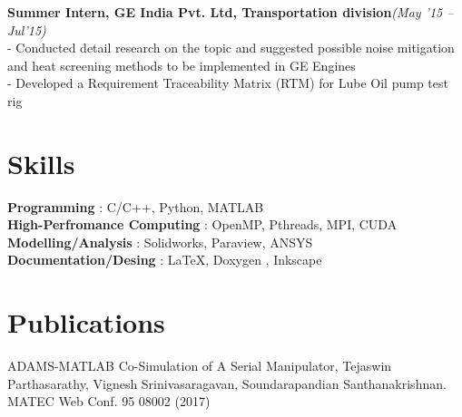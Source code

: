 \documentclass[margin,line]{res}
\begin{document}
\begin{resume}
\textbullet\hspace{0.005cm} {\bf Summer Intern, GE India Pvt. Ltd, Transportation division}\hfill {\em (May '15 -- Jul'15)}\\
- Conducted detail research on the topic and suggested possible noise mitigation and heat screening methods to be implemented in GE Engines\\
- Developed a Requirement Traceability Matrix (RTM) for Lube Oil pump test rig

\section {\sc Skills}
\textbullet\hspace{0.005cm} {\bf Programming} : C/C++, Python, MATLAB \\
\textbullet\hspace{0.005cm} {\bf High-Perfromance Computing} : OpenMP, Pthreads, MPI, CUDA\\
\textbullet\hspace{0.005cm} {\bf Modelling/Analysis} : Solidworks, Paraview, ANSYS\\
\textbullet\hspace{0.005cm} {\bf Documentation/Desing} : \LaTeX, Doxygen , Inkscape 


\section {\sc Publications}
\textbullet\hspace{0.005cm} ADAMS-MATLAB Co-Simulation of A Serial Manipulator, Tejaswin  Parthasarathy, Vignesh Srinivasaragavan, Soundarapandian  Santhanakrishnan. MATEC Web Conf. 95 08002 (2017) 
\end{resume}
\end{document}
